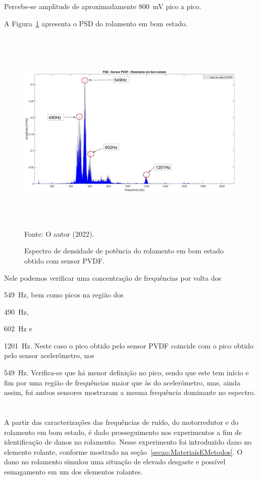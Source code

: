 \documentclass[
	12pt,				
	oneside,			
	a4paper,			
	english,			
	brazil,	
	sumario=abnt-6027-2012		
	]{abntex2ppgsi}
\begin{document}
{{{{{{{{{{{Percebe-se amplitude de aproximadamente {\SI{800}{\milli\volt}} pico a pico.

A Figura~\ref{PSD_ROLAMENTO_BOM} apresenta o PSD do rolamento em bom estado.

\begin{figure}[H]
\centering
\caption {Espectro de densidade de potência do rolamento em bom estado obtido com sensor PVDF.}
\includegraphics[width=\textwidth,height=100mm,keepaspectratio]{PSD_PVDF_ROLAMENTO_BOM} \\
Fonte: O autor (2022).
\label{PSD_ROLAMENTO_BOM}
\end{figure} 

Nele podemos verificar uma concentração de frequências por volta dos {\SI{549}{\hertz}, bem como picos na região dos {\SI{490}{\hertz}, {\SI{602}{\hertz} e {\SI{1201}{\hertz}. Neste caso o pico obtido pelo sensor PVDF coincide com o pico obtido pelo sensor acelerômetro, nos {\SI{549}{\hertz}. Verifica-se que há menor definição no pico, sendo que este tem início e fim por uma região de frequências maior que às do acelerômetro, mas, ainda assim, foi ambos sensores mostraram a mesma frequência dominante no espectro. 

\newpage
\section{}

A partir das caracterizações das frequências de ruído, do motorredutor e do rolamento em bom estado, é dado prosseguimento nos experimentos a fim de identificação de danos no rolamento. Nesse experimento foi introduzido dano no elemento rolante, conforme mostrado na seção~\ref{secao:MateriaisEMetodos}. O dano no rolamento simulou uma situação de elevado desgaste e possível esmagamento em um dos elementos rolantes. 

}}}}}}}}}}}}}}}}
\end{document}
